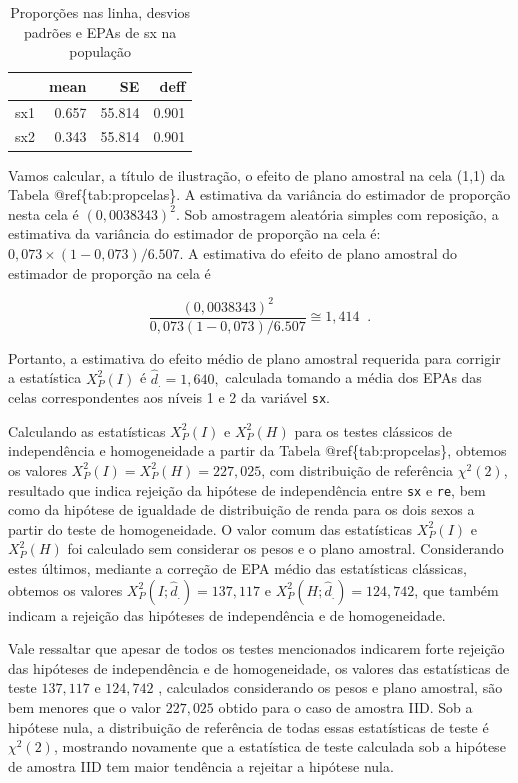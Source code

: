 \documentclass[]{book}
\numberwithin{example}{chapter}
\numberwithin{remark}{chapter}
\numberwithin{definition}{chapter}
\begin{document}
\begin{table}

\caption{\label{tab:unnamed-chunk-99}Proporções nas linha, desvios padrões e EPAs de sx na população}
\centering
\begin{tabular}[t]{l|r|r|r}
\hline
  & mean & SE & deff\\
\hline
sx1 & 0.657 & 55.814 & 0.901\\
\hline
sx2 & 0.343 & 55.814 & 0.901\\
\hline
\end{tabular}
\end{table}

Vamos calcular, a título de ilustração, o efeito de plano amostral na
cela (1,1) da Tabela @ref\{tab:propcelas\}. A estimativa da variância do
estimador de proporção nesta cela é \(\left(0,0038343\right) ^{2}\). Sob
amostragem aleatória simples com reposição, a estimativa da variância do
estimador de proporção na cela é:
\(0,073\times \left( 1-0,073\right) /6.507\). A estimativa do efeito de
plano amostral do estimador de proporção na cela é

\[
\frac{\left( 0,0038343\right) ^{2}}{0,073\left( 1-0,073\right) /6.507}\cong
1,414\;\;. 
\]

Portanto, a estimativa do efeito médio de plano amostral requerida para
corrigir a estatística \(X_{P}^{2}\left( I\right)\) é
\(\hat{d}_{.}=1,640,\) calculada tomando a média dos EPAs das celas
correspondentes aos níveis 1 e 2 da variável \texttt{sx}.

Calculando as estatísticas \(X_{P}^{2}\left( I\right)\) e
\(X_{P}^{2}\left( H\right)\) para os testes clássicos de independência e
homogeneidade a partir da Tabela @ref\{tab:propcelas\}, obtemos os
valores \(X_{P}^{2}\left( I\right) =X_{P}^{2}\left( H\right) =227,025\),
com distribuição de referência \(\chi ^{2}\left( 2\right)\), resultado
que indica rejeição da hipótese de independência entre \texttt{sx} e
\texttt{re}, bem como da hipótese de igualdade de distribuição de renda
para os dois sexos a partir do teste de homogeneidade. O valor comum das
estatísticas \(X_{P}^{2}\left( I\right)\) e \(X_{P}^{2}\left( H\right)\)
foi calculado sem considerar os pesos e o plano amostral. Considerando
estes últimos, mediante a correção de EPA médio das estatísticas
clássicas, obtemos os valores
\(X_{P}^{2}\left( I;\hat{d} _{.}\right) =137,117\) e
\(X_{P}^{2}\left( H;\hat{d}_{.}\right) =124,742\), que também indicam a
rejeição das hipóteses de independência e de homogeneidade.

Vale ressaltar que apesar de todos os testes mencionados indicarem forte
rejeição das hipóteses de independência e de homogeneidade, os valores
das estatísticas de teste \(137,117\) e \(124,742\) , calculados
considerando os pesos e plano amostral, são bem menores que o valor
\(227,025\) obtido para o caso de amostra IID. Sob a hipótese nula, a
distribuição de referência de todas essas estatísticas de teste é
\(\chi ^{2}\left( 2\right)\), mostrando novamente que a estatística de
teste calculada sob a hipótese de amostra IID tem maior tendência a
rejeitar a hipótese nula.
\end{document}
